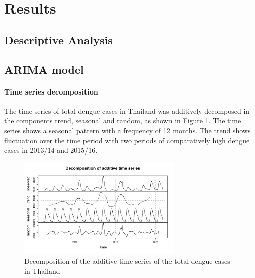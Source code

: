 \section{Results}
	\subsection{Descriptive Analysis}

	\subsection{ARIMA model}
	\paragraph{Time series decomposition}The time series of total dengue cases in Thailand was additively decomposed in the components trend, seasonal and random, as shown in Figure \ref{fig:decomp_ts_dengue}. The time series shows a seasonal pattern with a frequency of 12 months. The trend shows fluctuation over the time period with two periods of comparatively high dengue cases in 2013/14 and 2015/16.
	
	\begin{figure}[htbp] 
		\centering
		\includegraphics[width=0.7\textwidth]{fig/Decomposition_of_add_ts.png}
		\caption{ Decomposition of the additive time series of the total dengue cases in Thailand}
		\label{fig:decomp_ts_dengue}
	\end{figure}
	
